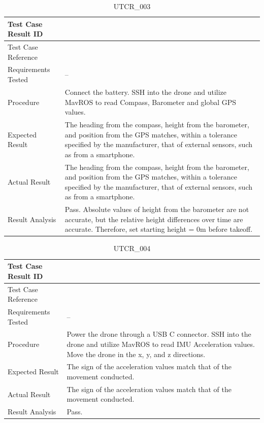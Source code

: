 \documentclass[12pt, titlepage]{article}
\begin{document}
\begin{table}[!h]
\begin{center}
\caption {UTCR\_003}
\label{tab:UTCR_003}
\begin{tabular}{ | m{3.2cm} | m{12.2cm} | } 
\hline
Test Case Result ID & \nameref{tab:UTCR_003} \\ 
\hline
Test Case Reference & \nameref{tab:UTC_003}  \\ 
\hline
Requirements Tested & -- \\ 
\hline
Procedure & Connect the battery. SSH into the drone and utilize MavROS to read Compass, Barometer and global GPS values.  \\ 
\hline
Expected Result & The heading from the compass, height from the barometer, and position from the GPS matches, within a tolerance specified by the manufacturer, that of external sensors, such as from a smartphone. \\ 
\hline
Actual Result & The heading from the compass, height from the barometer, and position from the GPS matches, within a tolerance specified by the manufacturer, that of external sensors, such as from a smartphone. \\ 
\hline
Result Analysis & Pass. Absolute values of height from the barometer are not accurate, but the relative height differences over time are accurate. Therefore, set starting height = 0m before takeoff. \\ 
\hline
\end{tabular}
\end{center}
\end{table}

\begin{table}[!h]
\begin{center}
\caption {UTCR\_004}
\label{tab:UTCR_004}
\begin{tabular}{ | m{3.2cm} | m{12.2cm} | } 
\hline
Test Case Result ID & \nameref{tab:UTCR_004} \\ 
\hline
Test Case Reference & \nameref{tab:UTC_004}  \\ 
\hline
Requirements Tested & -- \\ 
\hline
Procedure & Power the drone through a USB C connector. SSH into the drone and utilize MavROS to read IMU Acceleration values. Move the drone in the x, y, and z directions. \\ 
\hline
Expected Result & The sign of the acceleration values match that of the movement conducted. \\ 
\hline
Actual Result & The sign of the acceleration values match that of the movement conducted. \\ 
\hline
Result Analysis & Pass. \\ 
\hline
\end{tabular}
\end{center}
\end{table}
\end{document}
